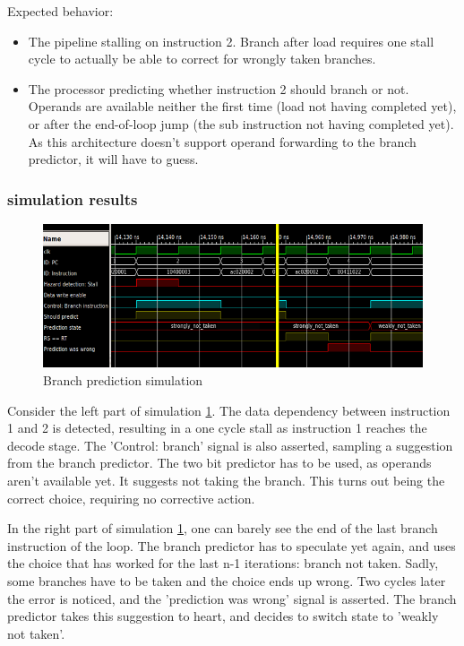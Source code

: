 Expected behavior:
\begin{itemize}
  \item
    The pipeline stalling on instruction 2. Branch after load requires one stall cycle to actually be able to correct for wrongly taken branches.
  \item
    The processor predicting whether instruction 2 should branch or not.
    Operands are available neither the first time (load not having completed yet), or after the end-of-loop jump (the sub instruction not having completed yet).
    As this architecture doesn't support operand forwarding to the branch predictor, it will have to guess.
\end{itemize}

\subsubsection*{simulation results}

\begin{figure}[H]
  \begin{center}
    \includegraphics[width=\textwidth]{assets/branch-prediction.png}
  \end{center}
  \caption{Branch prediction simulation}
  \label{fig:simulate_branch_prediction}
\end{figure}

Consider the left part of simulation \ref{fig:simulate_branch_prediction}.
The data dependency between instruction 1 and 2 is detected, resulting in a one cycle stall as instruction 1 reaches the decode stage.
The 'Control: branch' signal is also asserted, sampling a suggestion from the branch predictor.
The two bit predictor has to be used, as operands aren't available yet. It suggests not taking the branch.
This turns out being the correct choice, requiring no corrective action.

In the right part of simulation \ref{fig:simulate_branch_prediction}, one can barely see the end of the last branch instruction of the loop.
The branch predictor has to speculate yet again, and uses the choice that has worked for the last n-1 iterations: branch not taken.
Sadly, some branches have to be taken and the choice ends up wrong.
Two cycles later the error is noticed, and the 'prediction was wrong' signal is asserted.
The branch predictor takes this suggestion to heart, and decides to switch state to 'weakly not taken'.

